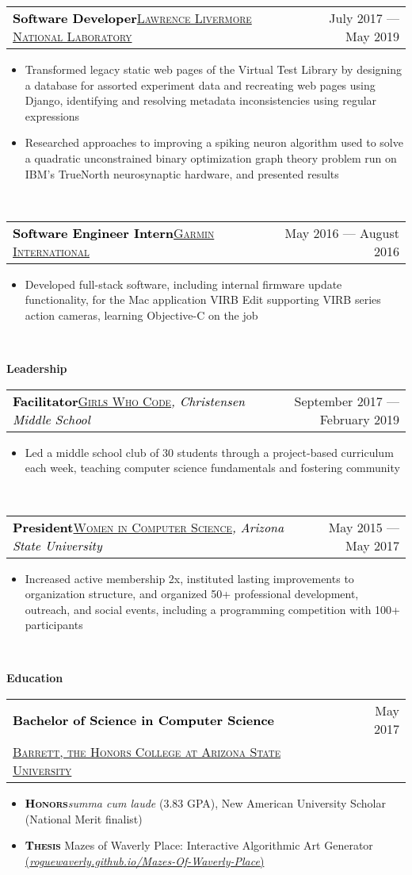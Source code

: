 \documentclass[letterpaper,11pt]{article}
\makeatletter
\newcommand{\boldsc}[1]{\textcolor{black}{\textbf{\textsc{#1}}}}
\newcommand{\resumeSpacing}{5pt}
\newcommand{\resumeSection}[1]{
  \begin{flushleft}
  {\LARGE
  \textcolor{accent}{\textbf{#1}}
  \hrulefill}
  \end{flushleft}
}
\newcommand{\resumeSubsection}[5]{
  \begin{center}
	\begin{tabular*}{\textwidth}{l@{\extracolsep{\fill}}r}
	\large\textcolor{black}{\textbf{#1}}\normalsize\textcolor{black}{\quad\href{#4}{\textsc{#3}}\textit{#5}} & \small\textcolor{accent}{#2} \\
	\end{tabular*}
  \vspace{-\resumeSpacing}
  \vspace{-\resumeSpacing}
  \end{center}
}
\newcommand{\resumeSubsectionTwo}[5]{
  \begin{center}
	\begin{tabular*}{\textwidth}{l@{\extracolsep{\fill}}r}
	\large\textcolor{black}{\textbf{#1}} & \small\textcolor{accent}{#2} \\
  \textcolor{black}{\href{#4}{\textsc{#3}}\textit{#5}} & \\
	\end{tabular*}
  \vspace{-\resumeSpacing}
  \end{center}
}
\newenvironment{resumeItemize}{
  \addtolength{\leftmargini}{-\resumeSpacing}
  \begin{minipage}{0.99\textwidth}
  \begin{itemize}
  \small
}{
  \end{itemize}
  \vspace{0pt}
  \end{minipage}
  \normalsize
  \ \\
}
\newcommand{\resumeItem}[1]
{
  \raggedright
  \item{#1}
  \vspace{-\resumeSpacing}
}
\makeatother
\begin{document}
  \resumeSubsection
  {Software Developer}{July 2017 --- May 2019}
  {Lawrence Livermore National Laboratory}{https://www.llnl.gov/}{}
  \begin{resumeItemize}
    \resumeItem
    {Transformed legacy static web pages of the Virtual Test Library by designing a database for assorted experiment data and recreating web pages using Django, identifying and resolving metadata inconsistencies using regular expressions}
    \resumeItem
    {Researched approaches to improving a spiking neuron algorithm used to solve a quadratic unconstrained binary optimization graph theory problem run on IBM's TrueNorth neurosynaptic hardware, and presented results}
  \end{resumeItemize}
	\resumeSubsection
  {Software Engineer Intern}{May 2016 --- August 2016}
  {Garmin International}{https://www.garmin.com/}{}
	\begin{resumeItemize}
    \resumeItem
    {Developed full-stack software, including internal firmware update functionality, for the Mac application VIRB Edit supporting VIRB series action cameras, learning Objective-C on the job}
	\end{resumeItemize}
  \resumeSection{Leadership}
  \resumeSubsection
  {Facilitator}{September 2017 --- February 2019}
  {Girls Who Code}{https://girlswhocode.com/}{, Christensen Middle School}
  \begin{resumeItemize}
    \resumeItem
    {Led a middle school club of 30 students through a project-based curriculum each week, teaching computer science fundamentals and fostering community}
  \end{resumeItemize}
  \resumeSubsection
  {President}{May 2015 --- May 2017}
  {Women in Computer Science}{http://wics-asu.org/}{, Arizona State University}
  \begin{resumeItemize}
    \resumeItem
    {Increased active membership 2x, instituted lasting improvements to organization structure, and organized 50+ professional development, outreach, and social events, including a programming competition with 100+ participants}
  \end{resumeItemize}
  \resumeSection{Education}
  \resumeSubsectionTwo
  {Bachelor of Science in Computer Science}{May 2017}
  {Barrett, the Honors College at Arizona State University}{https://barretthonors.asu.edu/}{}
  \begin{resumeItemize}
	  \resumeItem
    {\boldsc{Honors}\space\textit{summa cum laude} (3.83 GPA), New American University Scholar (National Merit finalist)}
	  \resumeItem
    {\boldsc{Thesis} Mazes of Waverly Place: Interactive Algorithmic Art Generator \href{https://roguewaverly.github.io/Mazes-Of-Waverly-Place/}{(\textit{roguewaverly.github.io/Mazes-Of-Waverly-Place})}}
  \end{resumeItemize}
  \vspace{-\resumeSpacing}
\end{document}

